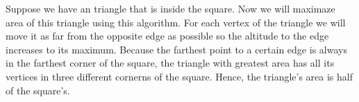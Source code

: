 \documentclass{fkssolpub}
\author{Ondřej Sedláček}
\begin{document}
Suppose we have an triangle that is inside the square. Now we will maximaze
area of this triangle using this algorithm. For each vertex of the triangle
we will move it as far from the opposite edge as possible so the altitude
to the edge increases to its maximum. Because the farthest point to a
certain edge is always in the farthest corner of the square, the triangle
with greatest area has all its vertices in three different cornerns of the
square. Hence, the triangle's area is half of the square's.
\end{document}
